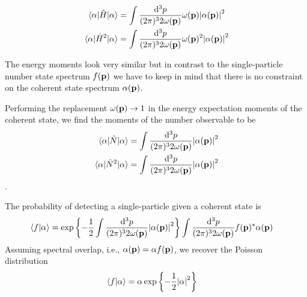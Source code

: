 \begin{lemma}
	\begin{align}
		\expval{\hat{H}}{\alpha}
		&=
		\int\frac{\dd[3]{p}}{(2\pi)^32\omega(\vb{p})}
		\omega(\vb{p})
		\abs{\alpha(\vb{p})}^2
		\\
		\expval{\hat{H}^2}{\alpha}
		&=
		\int\frac{\dd[3]{p}}{(2\pi)^32\omega(\vb{p})}
		\omega(\vb{p})^2
		\abs{\alpha(\vb{p})}^2
	\end{align}	
\end{lemma}
\begin{remark}
	The energy moments look very similar but in contrast to the single-particle number state spectrum $f(\vb{p})$ we have to keep in mind that there is no constraint on the coherent state spectrum $\alpha(\vb{p})$.
\end{remark}
\begin{corollary}
	Performing the replacement $\omega(\vb{p})\to1$ in the energy expectation moments of the coherent state, we find the moments of the number observable to be
	\begin{align}
		\expval{\hat{N}}{\alpha}
		&=
		\int\frac{\dd[3]{p}}{(2\pi)^32\omega(\vb{p})}
		\abs{\alpha(\vb{p})}^2
		\\
		\expval{\hat{N}^2}{\alpha}
		&=
		\int\frac{\dd[3]{p}}{(2\pi)^32\omega(\vb{p})}
		\abs{\alpha(\vb{p})}^2
	\end{align}
	.
\end{corollary}

The probability of detecting a single-particle given a coherent state is
\begin{equation}
	\begin{split}
		\braket{f}{\alpha}
		&=
		\exp\left\{
			-
			\frac{1}{2}
			\int\frac{\dd[3]{p}}{(2\pi)^32\omega(\vb{p})}
			\abs{\alpha(\vb{p})}^2
		\right\}
		\int\frac{\dd[3]{p}}{(2\pi)^32\omega(\vb{p})}
		f(\vb{p})^*
		\alpha(\vb{p})
	\end{split}
\end{equation}
Assuming spectral overlap, i.e., $\alpha(\vb{p})=\alpha f(\vb{p})$, we recover the Poisson distribution
\begin{equation}
	\begin{split}
		\braket{f}{\alpha}
		&=
		\alpha
		\exp\left\{
			-
			\frac{1}{2}
			\abs{\alpha}^2
		\right\}
	\end{split}
\end{equation}
